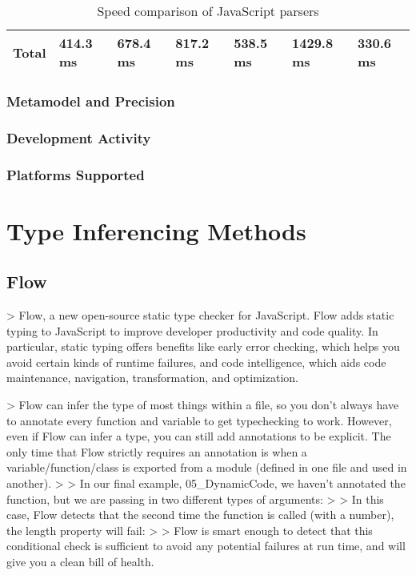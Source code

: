 \begin{table}[!htb]
\begin{tabular}{@{}lllllll@{}}
\textbf{Total}                                                & \textbf{414.3 ms}                                                & \textbf{678.4 ms}                                       & \textbf{817.2 ms}                                       & \textbf{538.5 ms}                                              & \textbf{1429.8 ms}                                      & \textbf{330.6 ms}                                                          \\ \bottomrule
\end{tabular}

\caption{Speed comparison of JavaScript parsers}
\label{table:speed-comparison-of-parsers}
\end{table}

\subsubsection{Metamodel and Precision}
\subsubsection{Development Activity}
\subsubsection{Platforms Supported}

\section{Type Inferencing Methods}
\label{sect:javascript-type-inferencers}

\subsection{Flow}
> Flow, a new open-source static type checker for JavaScript. Flow adds static typing to JavaScript to improve developer productivity and code quality. In particular, static typing offers benefits like early error checking, which helps you avoid certain kinds of runtime failures, and code intelligence, which aids code maintenance, navigation, transformation, and optimization.


> Flow can infer the type of most things within a file, so you don't always have to annotate every function and variable to get typechecking to work. However, even if Flow can infer a type, you can still add annotations to be explicit. The only time that Flow strictly requires an annotation is when a variable/function/class is exported from a module (defined in one file and used in another).
>
> In our final example, 05\_DynamicCode, we haven't annotated the function, but we are passing in two different types of arguments:
>
> In this case, Flow detects that the second time the function is called (with a number), the length property will fail:
>
> Flow is smart enough to detect that this conditional check is sufficient to avoid any potential failures at run time, and will give you a clean bill of health.

